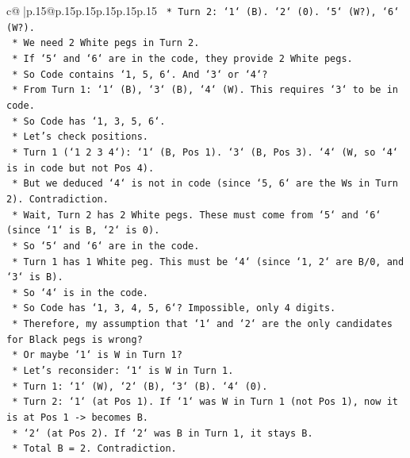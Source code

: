 \documentclass{article}
\begin{document}
{\begin{supertabular}{c@{$\;$}|p{.15\linewidth}@{}p{.15\linewidth}p{.15\linewidth}p{.15\linewidth}p{.15\linewidth}p{.15\linewidth}}
{{{\texttt{                *   Turn 2: `1` (B). `2` (0). `5` (W?), `6` (W?).} \\
\texttt{                *   We need 2 White pegs in Turn 2.} \\
\texttt{                *   If `5` and `6` are in the code, they provide 2 White pegs.} \\
\texttt{                *   So Code contains `1, 5, 6`. And `3` or `4`?} \\
\texttt{                *   From Turn 1: `1` (B), `3` (B), `4` (W). This requires `3` to be in code.} \\
\texttt{                *   So Code has `1, 3, 5, 6`.} \\
\texttt{                *   Let's check positions.} \\
\texttt{                *   Turn 1 (`1 2 3 4`): `1` (B, Pos 1). `3` (B, Pos 3). `4` (W, so `4` is in code but not Pos 4).} \\
\texttt{                *   But we deduced `4` is not in code (since `5, 6` are the Ws in Turn 2). Contradiction.} \\
\texttt{                *   Wait, Turn 2 has 2 White pegs. These must come from `5` and `6` (since `1` is B, `2` is 0).} \\
\texttt{                *   So `5` and `6` are in the code.} \\
\texttt{                *   Turn 1 has 1 White peg. This must be `4` (since `1, 2` are B/0, and `3` is B).} \\
\texttt{                *   So `4` is in the code.} \\
\texttt{                *   So Code has `1, 3, 4, 5, 6`? Impossible, only 4 digits.} \\
\texttt{                *   Therefore, my assumption that `1` and `2` are the only candidates for Black pegs is wrong?} \\
\texttt{                *   Or maybe `1` is W in Turn 1?} \\
\texttt{                *   Let's reconsider: `1` is W in Turn 1.} \\
\texttt{                    *   Turn 1: `1` (W), `2` (B), `3` (B). `4` (0).} \\
\texttt{                    *   Turn 2: `1` (at Pos 1). If `1` was W in Turn 1 (not Pos 1), now it is at Pos 1 {-}> becomes B.} \\
\texttt{                    *   `2` (at Pos 2). If `2` was B in Turn 1, it stays B.} \\
\texttt{                    *   Total B = 2. Contradiction.} \\
}}}
\end{supertabular}}
\end{document}
